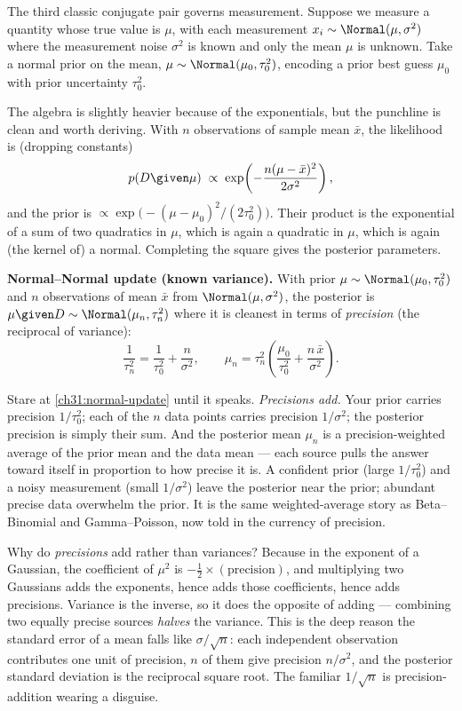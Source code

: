 The third classic conjugate pair governs measurement. Suppose we measure a quantity whose
true value is $\mu$, with each measurement $x_i \sim \Normal(\mu, \sigma^2)$ where the
measurement noise $\sigma^2$ is known and only the mean $\mu$ is unknown. Take a normal
prior on the mean, $\mu \sim \Normal(\mu_0, \tau_0^2)$, encoding a prior best guess $\mu_0$
with prior uncertainty $\tau_0^2$.

The algebra is slightly heavier because of the exponentials, but the punchline is clean and
worth deriving. With $n$ observations of sample mean $\bar x$, the likelihood is (dropping
constants)
\[
  p(D\given\mu)\;\propto\;\exp\!\left(-\frac{n(\mu-\bar x)^2}{2\sigma^2}\right),
\]
and the prior is $\propto \exp\!\big(-(\mu-\mu_0)^2/(2\tau_0^2)\big)$. Their product is the
exponential of a sum of two quadratics in $\mu$, which is again a quadratic in $\mu$, which
is again (the kernel of) a normal. Completing the square gives the posterior parameters.

\begin{formalbox}
\textbf{Normal--Normal update (known variance).} With prior $\mu\sim\Normal(\mu_0,\tau_0^2)$
and $n$ observations of mean $\bar x$ from $\Normal(\mu,\sigma^2)$, the posterior is
$\mu\given D \sim \Normal(\mu_n, \tau_n^2)$ where it is cleanest in terms of
\emph{precision} (the reciprocal of variance):
\begin{equation}
  \frac{1}{\tau_n^2} = \frac{1}{\tau_0^2} + \frac{n}{\sigma^2},
  \qquad
  \mu_n = \tau_n^2\!\left(\frac{\mu_0}{\tau_0^2} + \frac{n\,\bar x}{\sigma^2}\right).
  \label{ch31:normal-update}
\end{equation}
\end{formalbox}

Stare at \eqref{ch31:normal-update} until it speaks. \emph{Precisions add.} Your prior
carries precision $1/\tau_0^2$; each of the $n$ data points carries precision
$1/\sigma^2$; the posterior precision is simply their sum. And the posterior mean $\mu_n$
is a precision-weighted average of the prior mean and the data mean --- each source pulls
the answer toward itself in proportion to how precise it is. A confident prior (large
$1/\tau_0^2$) and a noisy measurement (small $1/\sigma^2$) leave the posterior near the
prior; abundant precise data overwhelm the prior. It is the same weighted-average story as
Beta--Binomial and Gamma--Poisson, now told in the currency of precision.

\begin{whybox}
Why do \emph{precisions} add rather than variances? Because in the exponent of a Gaussian,
the coefficient of $\mu^2$ is $-\tfrac12 \times (\text{precision})$, and multiplying two
Gaussians adds the exponents, hence adds those coefficients, hence adds precisions. Variance
is the inverse, so it does the opposite of adding --- combining two equally precise sources
\emph{halves} the variance. This is the deep reason the standard error of a mean falls like
$\sigma/\sqrt n$: each independent observation contributes one unit of precision, $n$ of
them give precision $n/\sigma^2$, and the posterior standard deviation is the reciprocal
square root. The familiar $1/\sqrt n$ is precision-addition wearing a disguise.
\end{whybox}

